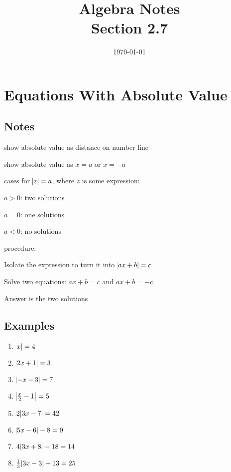 \documentclass[letterpaper, landscape]{exam}
\title{Algebra Notes \\ Section 2.7 }
\author{}
\date{\today}
\begin{document}
  \maketitle

  \section{Equations With Absolute Value}

  \subsection{Notes} %
  
  \begin{itemize*}
    \item show absolute value as distance on number line
    \item show absolute value as $x = a$ or $x = -a$
  \end{itemize*}

  cases for $\abs{ z } = a$, where $z$ is some expression:
  \begin{itemize*}
    \item $a > 0$: two solutions
    \item $a = 0$: one solutions
    \item $a < 0$: no solutions
  \end{itemize*}

  procedure:
  \begin{enumerate*}
    \item Isolate the expression to turn it into $\abs{ ax + b } = c$
    \item Solve two equations: $ax + b = c$ and $ax + b = -c$
    \item Answer is the two solutions
  \end{enumerate*}

  \subsection{Examples} %
  
  \begin{enumerate}

    \item $\abs{ x } = 4$

    \item $\abs{ 2x + 1 } = 3$

    \item $\abs{ -x - 3 } = 7$

    \item $\abs{ \frac{x}{2} - 1 } = 5$

    \item $2 \abs{ 3x - 7 } = 42$

    \item $\abs{ 5x - 6 } - 8 = 9$

    \item $4 \abs{ 3x + 8 } - 18 = 14$

    \item $\frac{1}{3} \abs{ 3x - 3 } + 13 = 25$


  \end{enumerate}
\end{document}
